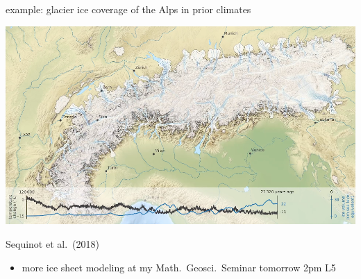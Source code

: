 \documentclass[svgnames,
               hyperref={colorlinks,citecolor=DeepPink4,linkcolor=FireBrick,urlcolor=Maroon},
               usepdftitle=false]  %
               {beamer}
\begin{document}
\begin{frame}{example: glacier ice coverage of the Alps in prior climates}

\includegraphics[width=1.02\textwidth]{images/alps-seguinot2018.png}

\vspace{-2mm}
\hfill {\tiny Sequinot et al.~(2018)}

{\footnotesize
\begin{itemize}
\item<2> more ice sheet modeling at my Math.~Geosci.~Seminar tomorrow 2pm L5
\end{itemize}
}
\end{frame}
\end{document}
